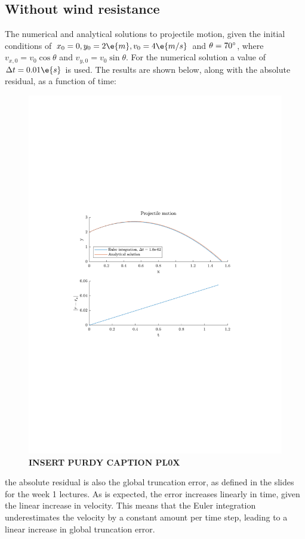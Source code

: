 \documentclass[a4paper,10pt]{article} 	%
\numberwithin{equation}{section}
\begin{document}
	\subsection{Without wind resistance}
	The numerical and analytical solutions to projectile motion, given the initial conditions of $ x_0 = 0,y_0 = 2 \e{m},v_0 = 4 \e{m/s}$ and $ \theta = 70\degree$, where $ v_{x,0} = v_0 \cos \theta $ and $ v_{y,0} = v_0 \sin \theta $. For the numerical solution a value of $ \Delta t = 0.01 \e{s}$ is used. The results are shown below, along with the absolute residual, as a function of time:
	\begin{figure}[H]
		\centering
		\includegraphics[width=0.7\linewidth]{projectile.pdf}
		\caption{\textbf{INSERT PURDY CAPTION PL0X}}
		\label{fig:projectile}
	\end{figure}
	the absolute residual is also the global truncation error, as defined in the slides for the week 1 lectures. As is expected, the error increases linearly in time, given the linear increase in velocity. This means that the Euler integration underestimates the velocity by a constant amount per time step, leading to a linear increase in global truncation error.
	
	
	
\end{document}
